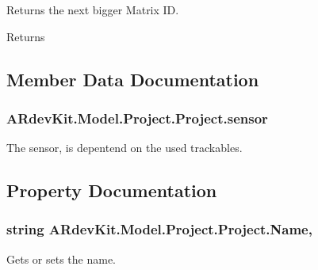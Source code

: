 Returns the next bigger Matrix I\-D. 

\begin{DoxyReturn}{Returns}

\end{DoxyReturn}


\subsection{Member Data Documentation}
\hypertarget{class_a_rdev_kit_1_1_model_1_1_project_1_1_project_a835cbe6aaacc0f7b0a60a1dd5745667e}{
\subsubsection[{sensor}]{ A\-Rdev\-Kit.\-Model.\-Project.\-Project.\-sensor\hspace{0.3cm}{\ttfamily [protected]}}}\label{class_a_rdev_kit_1_1_model_1_1_project_1_1_project_a835cbe6aaacc0f7b0a60a1dd5745667e}


The sensor, is depentend on the used trackables. 



\subsection{Property Documentation}
\hypertarget{class_a_rdev_kit_1_1_model_1_1_project_1_1_project_ae52006b6ebb8293ff034e8e00fdc4e77}{
\subsubsection[{Name}]{\setlength{\rightskip}{0pt plus 5cm}string A\-Rdev\-Kit.\-Model.\-Project.\-Project.\-Name\hspace{0.3cm}{\ttfamily [get]}, {\ttfamily [set]}}}\label{class_a_rdev_kit_1_1_model_1_1_project_1_1_project_ae52006b6ebb8293ff034e8e00fdc4e77}


Gets or sets the name. 

